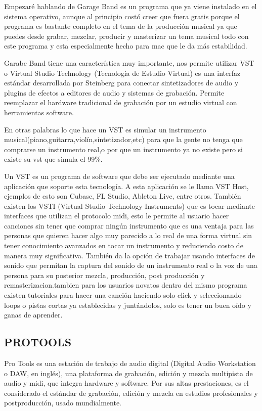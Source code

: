 Empezaré hablando de Garage Band es un programa que ya
viene instalado en el sistema operativo, aunque al principio
costó creer que fuera gratis porque el programa es bastante
completo en el tema de la producción musical ya que puedes
desde grabar, mezclar, producir y masterizar un tema musical
todo con este programa y esta especialmente hecho para mac
que le da más estabilidad.

Garabe Band tiene una característica muy importante, nos
permite utilizar VST o Virtual Studio Technology (Tecnología
de Estudio Virtual) es una interfaz estándar desarrollada por
Steinberg para conectar sintetizadores de audio y plugins de
efectos a editores de audio y sistemas de grabación. Permite
reemplazar el hardware tradicional de grabación por un estudio
virtual con herramientas software.

En otras palabras lo que hace un VST es simular un instrumento
musical(piano,guitarra,violín,sintetizador,etc) para que la gente
no tenga que comprarse un instrumento real,o por que un
instrumento ya no existe pero si existe su vst que simula el 99\%.

Un VST es un programa de software que debe ser ejecutado
mediante una aplicación que soporte esta tecnología. A esta
aplicación se le llama VST Host, ejemplos de esto son Cubase,
FL Studio, Ableton Live, entre otros.
También existen los VSTI (Virtual Studio Technology
Instruments) que es tocar mediante interfaces que utilizan el
protocolo midi, esto le permite al usuario hacer canciones sin
tener que comprar ningún instrumento que es una ventaja para
las personas que quieren hacer algo muy parecido a lo real de
una forma virtual sin tener conocimiento avanzados en tocar un
instrumento y reduciendo costo de manera muy significativa.
También da la opción de trabajar usando interfaces de sonido
que permitan la captura del sonido de un instrumento real o la
voz de una persona para su posterior mezcla, producción, post
producción y remasterizacion.tambien para los usuarios novatos
dentro del mismo programa existen tutoriales para hacer una
canción haciendo solo click y seleccionando loops o pistas cortas
ya establecidas y juntándolos, solo es tener un buen oído y
ganas de aprender.

\subsection*{PROTOOLS}

Pro Tools es una estación de trabajo de audio digital (Digital
Audio Workstation o DAW, en inglés), una plataforma de
grabación, edición y mezcla multipista de audio y midi, que
integra hardware y software. Por sus altas prestaciones, es el
considerado el estándar de grabación, edición y mezcla en
estudios profesionales y postproducción, usado mundialmente.

